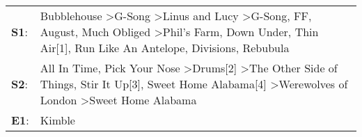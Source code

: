 \begin{supertabular}{p{0.03\textwidth}p{0.92\textwidth}}
 \textbf{S1}:  &  Bubblehouse\textsuperscript{} \textgreater \enspace G-Song\textsuperscript{} \textgreater \enspace Linus and Lucy\textsuperscript{} \textgreater \enspace G-Song\textsuperscript{}, \enspace FF\textsuperscript{}, \enspace August\textsuperscript{}, \enspace Much Obliged\textsuperscript{} \textgreater \enspace Phil's Farm\textsuperscript{}, \enspace Down Under\textsuperscript{}, \enspace Thin Air[1]\textsuperscript{}, \enspace Run Like An Antelope\textsuperscript{}, \enspace Divisions\textsuperscript{}, \enspace Rebubula\textsuperscript{}  \enspace  \\
 \textbf{S2}:  &                                                                                                                                                All In Time\textsuperscript{}, \enspace Pick Your Nose\textsuperscript{} \textgreater \enspace Drums[2]\textsuperscript{} \textgreater \enspace The Other Side of Things\textsuperscript{}, \enspace Stir It Up[3]\textsuperscript{}, \enspace Sweet Home Alabama[4]\textsuperscript{} \textgreater \enspace Werewolves of London\textsuperscript{} \textgreater \enspace Sweet Home Alabama\textsuperscript{}  \enspace  \\
 \textbf{E1}:  &                                                                                                                                                                                                                                                                                                                                                                                                                                                                                                                                      Kimble\textsuperscript{}  \enspace  \\
\end{supertabular}
